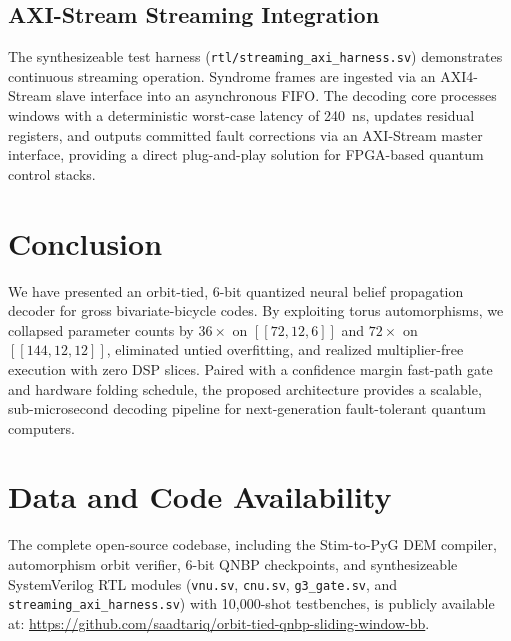 \documentclass[journal]{IEEEtran}
\begin{document}
\subsection{AXI-Stream Streaming Integration}
The synthesizeable test harness (\texttt{rtl/streaming\_axi\_harness.sv}) demonstrates continuous streaming operation. Syndrome frames are ingested via an AXI4-Stream slave interface into an asynchronous FIFO. The decoding core processes windows with a deterministic worst-case latency of 240~ns, updates residual registers, and outputs committed fault corrections via an AXI-Stream master interface, providing a direct plug-and-play solution for FPGA-based quantum control stacks.

\section{Conclusion}
We have presented an orbit-tied, 6-bit quantized neural belief propagation decoder for gross bivariate-bicycle codes. By exploiting torus automorphisms, we collapsed parameter counts by $36\times$ on $[[72,12,6]]$ and $72\times$ on $[[144,12,12]]$, eliminated untied overfitting, and realized multiplier-free execution with zero DSP slices. Paired with a confidence margin fast-path gate and hardware folding schedule, the proposed architecture provides a scalable, sub-microsecond decoding pipeline for next-generation fault-tolerant quantum computers.

\section*{Data and Code Availability}
The complete open-source codebase, including the Stim-to-PyG DEM compiler, automorphism orbit verifier, 6-bit QNBP checkpoints, and synthesizeable SystemVerilog RTL modules (\texttt{vnu.sv}, \texttt{cnu.sv}, \texttt{g3\_gate.sv}, and \texttt{streaming\_axi\_harness.sv}) with 10,000-shot testbenches, is publicly available at: \url{https://github.com/saadtariq/orbit-tied-qnbp-sliding-window-bb}.

\balance


\end{document}
